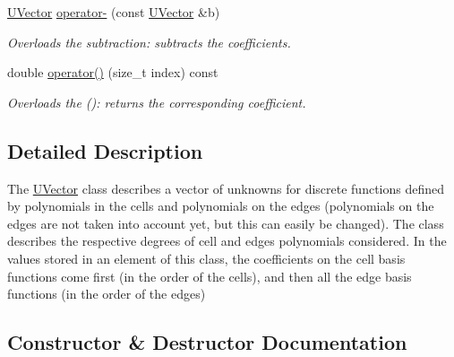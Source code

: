 \begin{DoxyCompactItemize}
\mbox{\label{classHArDCore2D_1_1UVector_a6256a41660c0ca12280dfc93f7cc890d}} 
\hyperlink{classHArDCore2D_1_1UVector}{U\+Vector} \hyperlink{classHArDCore2D_1_1UVector_a6256a41660c0ca12280dfc93f7cc890d}{operator-\/} (const \hyperlink{classHArDCore2D_1_1UVector}{U\+Vector} \&b)
\begin{DoxyCompactList}\small\item\em Overloads the subtraction\+: subtracts the coefficients. \end{DoxyCompactList}\item 
\mbox{\label{classHArDCore2D_1_1UVector_afede4bb5d9e9d4ea1255f84911217ef1}} 
double \hyperlink{classHArDCore2D_1_1UVector_afede4bb5d9e9d4ea1255f84911217ef1}{operator()} (size\+\_\+t index) const
\begin{DoxyCompactList}\small\item\em Overloads the ()\+: returns the corresponding coefficient. \end{DoxyCompactList}\end{DoxyCompactItemize}


\subsection{Detailed Description}
The \hyperlink{classHArDCore2D_1_1UVector}{U\+Vector} class describes a vector of unknowns for discrete functions defined by polynomials in the cells and polynomials on the edges (polynomials on the edges are not taken into account yet, but this can easily be changed). The class describes the respective degrees of cell and edges polynomials considered. In the values stored in an element of this class, the coefficients on the cell basis functions come first (in the order of the cells), and then all the edge basis functions (in the order of the edges) 

\subsection{Constructor \& Destructor Documentation}
\mbox{\label{classHArDCore2D_1_1UVector_ac4eb49bfec491212a818bd6f6ef48e8d}} 
